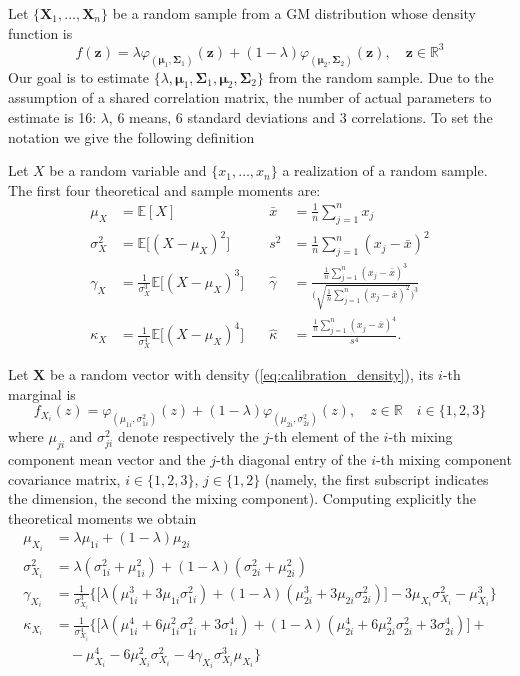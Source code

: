 Let $\{\bm{X}_1,\ldots,\bm{X}_n \}$ be a random sample from a GM distribution whose density function is 
\begin{equation}\label{eq:calibration_density}
f(\bm{z}) = \lambda \varphi_{(\bm{\mu}_1,\bm{\Sigma}_1)}(\bm{z}) + (1-\lambda)\varphi_{(\bm{\mu}_2,\bm{\Sigma}_2)}(\bm{z}),\quad \bm{z} \in \mathbb{R}^3
\end{equation}
Our goal is to estimate $\{\lambda,\bm{\mu}_1,\bm{\Sigma}_1,\bm{\mu}_2,\bm{\Sigma}_2 \}$ from the random sample. Due to the assumption of a shared correlation matrix, the number of actual parameters to estimate is 16: $\lambda$, 6 means, 6 standard deviations and 3 correlations.
To set the notation we give the following definition
\begin{definition}
	Let $X$ be a random variable and $\{x_1,\ldots,x_n\} $ a realization of a random sample. The first four theoretical and sample moments are:
	\begin{align*}
	\mu_X & = \mathbb{E}[X] \quad & \bar{x} &= \frac{1}{n}\sum_{j=1}^{n}x_j\\[2ex]
	\sigma^2_X & = \mathbb{E}\big[(X-\mu_X)^2\big] \quad & s^2 &= \frac{1}{n}\sum_{j=1}^{n}(x_j-\bar{x})^2\\[2ex]
	\gamma_X & = \frac{1}{\sigma_X^3}\mathbb{E}\big[(X-\mu_X)^3\big] \quad & \widehat{\gamma} & = \frac{\frac{1}{n}\sum_{j=1}^{n}(x_j-\bar{x})^3}{\Big(\sqrt{\frac{1}{n}\sum_{j=1}^{n}(x_j-\bar{x})^2} \Big)^3}\\[2ex]
	\kappa_X & = \frac{1}{\sigma_X^4}\mathbb{E}\big[ (X-\mu_X)^4\big] \quad & \widehat{\kappa}&= \frac{\frac{1}{n}\sum_{j=1}^{n}(x_j-\bar{x})^4}{s^4}.
	\end{align*}
\end{definition}
Let $\bm{X}$ be a random vector with density (\ref{eq:calibration_density}), its $i$-th marginal is \[f_{X_i}(z) = \varphi_{(\mu_{1i},\sigma^2_{1i})}(z)+(1-\lambda)\varphi_{(\mu_{2i},\sigma^2_{2i})}(z), \quad z \in \mathbb{R} \quad  i \in \{1,2,3\} \]
where $\mu_{ji}$ and $\sigma^2_{ji}$ denote respectively the $j$-th element of the $i$-th mixing component mean vector  and the $j$-th diagonal entry of the $i$-th mixing component covariance matrix, $i \in \{1,2,3\}$, $j \in \{1,2\}$ (namely, the first subscript indicates the dimension, the second the mixing component). Computing explicitly the theoretical moments we obtain
\begin{align*}
\mu_{X_i} & = \lambda\mu_{1i}+(1-\lambda)\mu_{2i}\\[15pt] 
\sigma^2_{X_i} & = \lambda(\sigma^2_{1i}+\mu^2_{1i})+(1-\lambda)(\sigma^2_{2i}+\mu^2_{2i})\\[15pt]
\gamma_{X_i} & = \frac{1}{\sigma^3_{X_i}}\Big\{\big[\lambda(\mu^3_{1i}+3\mu_{1i}\sigma^2_{1i}) + (1-\lambda)(\mu^3_{2i}+3\mu_{2i}\sigma^2_{2i})\big] -3\mu_{X_i}\sigma^2_{X_i}-\mu^3_{X_i} \Big\}\\[15pt]
\kappa_{X_i}&= \frac{1}{\sigma^4_{X_i}}\Big\{\big[\lambda(\mu^4_{1i}+6\mu^2_{1i}\sigma^2_{1i}+3\sigma^4_{1i})+(1-\lambda)(\mu^4_{2i}+6\mu^2_{2i}\sigma^2_{2i}+3\sigma^4_{2i}) \big] +\\
& \quad -\mu^4_{X_i} -6\mu^2_{X_i}\sigma^2_{X_i}-4\gamma_{X_i}\sigma^3_{X_i}\mu_{X_i} \Big\}
\end{align*}
